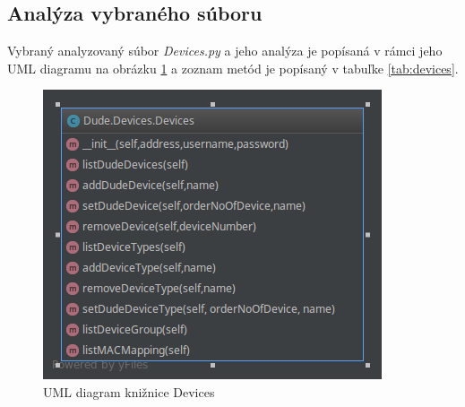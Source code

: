 \subsection{Analýza vybraného súboru}
Vybraný analyzovaný súbor \textit{Devices.py} a jeho analýza je popísaná v rámci jeho UML diagramu na obrázku \ref{fig:dudedev} a zoznam metód je popísaný v tabuľke \ref{tab:devices}.
\begin{figure}[H]
\centering
\includegraphics[scale=0.6]{../text/DudeDev.png}
\caption{UML diagram knižnice Devices}
\label{fig:dudedev}
\end{figure}
